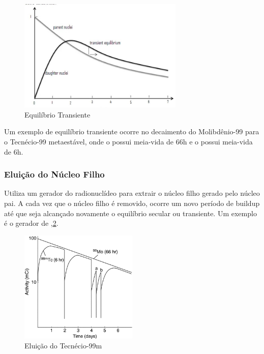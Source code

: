 \documentclass[11pt,a4paper]{article}
\newcounter{exemplo}
\begin{document}
                    \begin{figure}[h]
                        \centering
                        \includegraphics[width=0.7\textwidth]{Imagens/graficoEquilibrioTransiente.jpg}
                        \caption{Equilíbrio Transiente}
                        \label{fig:graficoEquilibrioTransiente}
                    \end{figure}

    Um exemplo de equilíbrio transiente ocorre no decaimento do Molibdênio-99 para o Tecnécio-99 metaestável, onde o  possui meia-vida de 66h e o  possui meia-vida de 6h.
                
\subsubsection*{Eluição do Núcleo Filho}

    Utiliza um gerador do radionuclídeo para extrair o núcleo filho gerado pelo núcleo pai. A cada vez que o núcleo filho é removido, ocorre um novo período de buildup até que seja alcançado novamente o equilíbrio secular ou transiente. Um exemplo é o gerador de ,\ref{fig:graficoEluicaoTecnecio}.


                    \begin{figure}[h]
                        \centering
                        \includegraphics[width=0.5\textwidth]{Imagens/graficoEluicaoTecnecio.jpg}
                        \caption{Eluição do Tecnécio-99m}
                        \label{fig:graficoEluicaoTecnecio}
                    \end{figure}
\end{document}
